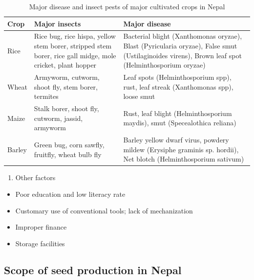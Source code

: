 \documentclass[
  openany]{book}
\providecommand{\tightlist}{%
  \setlength{\itemsep}{0pt}\setlength{\parskip}{0pt}}
\begin{document}
\begin{table}[H]

\caption{\label{tab:insect-pests-major}Major disease and insect pests of major cultivated crops in Nepal}
\centering
\begin{tabular}[t]{l>{\raggedright\arraybackslash}p{12em}>{\raggedright\arraybackslash}p{12em}}
\toprule
Crop & Major insects & Major disease\\
\midrule
\rowcolor{gray!6}  Rice & Rice bug, rice hispa, yellow stem borer, stripped stem borer, rice gall midge, mole cricket, plant hopper & Bacterial blight (Xanthomonas oryzae), Blast (Pyricularia oryzae), False smut (Ustilaginoides virens), Brown leaf spot (Helminthosporium oryzae)\\
Wheat & Armyworm, cutworm, shoot fly, stem borer, termites & Leaf spots (Helminthosporium spp), rust, leaf streak (Xanthomonas spp), loose smut\\
\rowcolor{gray!6}  Maize & Stalk borer, shoot fly, cutworm, jassid, armyworm & Rust, leaf blight (Helminthosporium maydis), smut (Specealothica reliana)\\
Barley & Green bug, corn sawfly, fruitfly, wheat bulb fly & Barley yellow dwarf virus, powdery mildew (Erysiphe graminis sp. hordii), Net blotch (Helminthosporium sativum)\\
\bottomrule
\end{tabular}
\end{table}

\begin{enumerate}
\def\labelenumi{\arabic{enumi}.}
\setcounter{enumi}{6}
\tightlist
\item
  Other factors
\end{enumerate}

\begin{itemize}
\tightlist
\item
  Poor education and low literacy rate
\item
  Customary use of conventional tools; lack of mechanization
\item
  Improper finance
\item
  Storage facilities
\end{itemize}

\hypertarget{scope-of-seed-production-in-nepal}{%
\subsection{Scope of seed production in Nepal}\label{scope-of-seed-production-in-nepal}}
\end{document}
